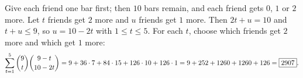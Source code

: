 Give each friend one bar first; then $10$ bars remain, and each friend gets $0$, $1$ or $2$ more. Let $t$ friends get $2$ more and $u$ friends get $1$ more. Then $2t+u=10$ and $t+u\le9$, so $u=10-2t$ with $1\le t\le5$. For each $t$, choose which friends get $2$ more and which get $1$ more:
\[\sum_{t=1}^{5}\dbinom9t\dbinom{9-t}{10-2t}=9+36\cdot7+84\cdot15+126\cdot10+126\cdot1=9+252+1260+1260+126=\boxed{2907}.\]
